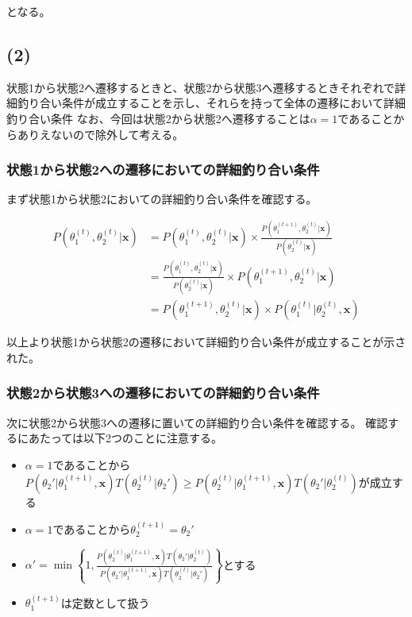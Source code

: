 \noindent となる。

\subsection{(2)}
\hspace{1em}状態1から状態2へ遷移するときと、状態2から状態3へ遷移するときそれぞれで詳細釣り合い条件が成立することを示し、それらを持って全体の遷移において詳細釣り合い条件
なお、今回は状態2から状態2へ遷移することは\(\alpha = 1\)であることからありえないので除外して考える。

\subsubsection{状態1から状態2への遷移においての詳細釣り合い条件}
\hspace{1em}まず状態1から状態2においての詳細釣り合い条件を確認する。

\begin{align}
    P(\theta_1^{(t)}, \theta_2^{(t)} | \bm{x})  &= P(\theta_1^{(t)}, \theta_2^{(t)} | \bm{x}) \times \frac{P(\theta_1^{(t+1)}, \theta_2^{(t)} | \bm{x})}{P(\theta_2^{(t)} | \bm{x})} \\
                                                &= \frac{P(\theta_1^{(t)}, \theta_2^{(t)} | \bm{x})}{P(\theta_2^{(t)} | \bm{x})} \times P(\theta_1^{(t + 1)}, \theta_2^{(t)} | \bm{x}) \\
                                                &= P(\theta_1^{(t + 1)}, \theta_2^{(t)} | \bm{x}) \times P(\theta_1^{(t)} | \theta_2^{(t)}, \bm{x})
\end{align}

以上より状態1から状態2の遷移において詳細釣り合い条件が成立することが示された。

\subsubsection{状態2から状態3への遷移においての詳細釣り合い条件}
\hspace{1em}次に状態2から状態3への遷移に置いての詳細釣り合い条件を確認する。
確認するにあたっては以下2つのことに注意する。

\begin{itemize}
    \item \(\alpha = 1\)であることから\(P(\theta_2' | \theta_1^{(t + 1)}, \bm{x})T(\theta_2^{(t)} | \theta_2') \geq P(\theta_2^{(t)} | \theta_1^{(t + 1)}, \bm{x})T(\theta_2' | \theta_2^{(t)})\)が成立する
    \item \(\alpha = 1\)であることから\(\theta_2^{(t + 1)} = \theta_2'\)
    \item \(\alpha' = \min\left\{1, \frac{P(\theta_2^{(t)} | \theta_1^{(t + 1)}, \bm{x})T(\theta_2' | \theta_2^{(t)})}{P(\theta_2' | \theta_1^{(t + 1)}, \bm{x})T(\theta_2^{(t)} | \theta_2')}\right\}\)とする
    \item \(\theta_1^{(t + 1)}\)は定数として扱う
\end{itemize}

